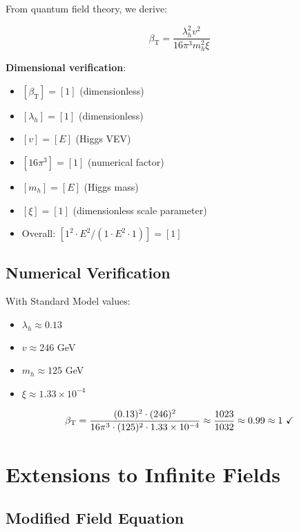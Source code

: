 \documentclass[12pt,a4paper]{article}
\newcommand{\betaT}{\beta_{\text{T}}}
\begin{document}
	From quantum field theory, we derive:
	
	\begin{equation}
		\label{eq:beta_higgs_formula}
		\betaT = \frac{\lambda_h^2 v^2}{16\pi^3 m_h^2 \xi}
	\end{equation}
	
	\textbf{Dimensional verification}:
	\begin{itemize}
		\item $[\betaT] = [1]$ (dimensionless)
		\item $[\lambda_h] = [1]$ (dimensionless)
		\item $[v] = [E]$ (Higgs VEV)
		\item $[16\pi^3] = [1]$ (numerical factor)
		\item $[m_h] = [E]$ (Higgs mass)
		\item $[\xi] = [1]$ (dimensionless scale parameter)
		\item Overall: $[1^2 \cdot E^2 / (1 \cdot E^2 \cdot 1)] = [1]$ \checkmark
	\end{itemize}
	
	\subsection{Numerical Verification}
	\label{subsec:numerical_verification}
	
	With Standard Model values:
	\begin{itemize}
		\item $\lambda_h \approx 0.13$
		\item $v \approx 246$ GeV
		\item $m_h \approx 125$ GeV
		\item $\xi \approx 1.33 \times 10^{-4}$
	\end{itemize}
	
	\begin{equation}
		\betaT = \frac{(0.13)^2 \cdot (246)^2}{16\pi^3 \cdot (125)^2 \cdot 1.33 \times 10^{-4}} \approx \frac{1023}{1032} \approx 0.99 \approx 1 \text{ \checkmark}
	\end{equation}
	
	\section{Extensions to Infinite Fields}
	\label{sec:infinite_fields}
	
	\subsection{Modified Field Equation}
	\label{subsec:modified_field_equation}
	
\end{document}
